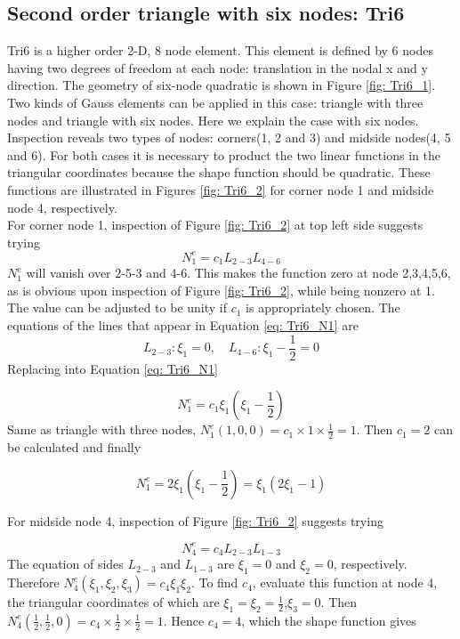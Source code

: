 \subsection{Second order triangle with six nodes: Tri6}
Tri6 is a higher order 2-D, 8 node element. This element is defined by 6 nodes having two degrees of freedom at each node: translation in the nodal x and y direction. The geometry of six-node quadratic is shown in Figure \ref{fig: Tri6_1}.  Two kinds of Gauss elements can be applied in this case: triangle with three nodes and triangle with six nodes. Here we explain the case with six nodes.  Inspection reveals two types of nodes: corners(1, 2 and 3) and midside nodes(4, 5 and 6). For both cases it is necessary to product the two linear functions in the triangular coordinates because the shape function should be quadratic. These functions are illustrated in Figures \ref{fig: Tri6_2} for corner node 1 and midside node 4, respectively. \\
For corner node 1, inspection of Figure \ref{fig: Tri6_2} at top left side suggests trying
\begin{equation} \label{eq: Tri6_N1}
N_1^e = c_1L_{2-3}L_{4-6}
\end{equation}
$N_1^e$ will vanish over 2-5-3 and 4-6. This makes the function zero at node 2,3,4,5,6, as is obvious upon inspection of Figure \ref{fig: Tri6_2}, while being nonzero at 1. The value can be adjusted to be unity if $c_1$ is appropriately chosen. The equations of the lines that appear  in Equation \ref{eq: Tri6_N1} are
\begin{equation}
L_{2-3}: \xi_1 = 0, \quad L_{4-6}: \xi_1 - \frac{1}{2} = 0
\end{equation}
Replacing into Equation \ref{eq: Tri6_N1}

\begin{equation}
N_1^e = c_1\xi_1 \left(\xi_1 - \frac{1}{2}\right)
\end{equation}
Same as triangle with three nodes, $N_1^e\left(1,0,0\right) = c_1 \times 1 \times \frac{1}{2} = 1$. Then $c_1 = 2$ can be calculated and finally 

\begin{equation}
N_1^e = 2\xi_1\left(\xi_1 - \frac{1}{2}\right) = \xi_1 \left(2 \xi_1 -1 \right)
\end{equation} 

For midside node 4, inspection of Figure \ref{fig: Tri6_2} suggests trying

\begin{equation}
N_4^e = c_4L_{2-3}L_{1-3}
\end{equation}
The equation of sides $L_{2-3}$ and $L_{1-3}$ are $\xi_1 = 0$ and $\xi_2 = 0$, respectively. Therefore $N_4^e\left(\xi_1, \xi_2, \xi_3\right) = c_4\xi_1\xi_2$. To find $c_4$, evaluate this function at node 4, the triangular coordinates of which are $\xi_1 = \xi_2 = \frac{1}{2}$,$\xi_3 = 0$. Then $N_4^e\left(\frac{1}{2}, \frac{1}{2}, 0\right) = c_4 \times \frac{1}{2} \times \frac{1}{2} = 1$. Hence $c_4 = 4$, which the shape function gives

